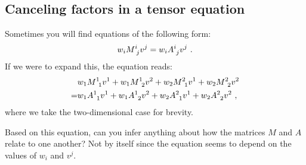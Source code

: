 \begin{subappendices}
\section{Canceling factors in a tensor equation}

Sometimes you will find equations of the following form:
\begin{align}
    w_i M\aij{i}{j}v^j = w_i A\aij{i}{j}v^j \ .
    \label{eq:canceling:factors:wMv}
\end{align}
If we were to expand this, the equation reads:
\begin{align}
    &w_1 M\aij{1}{1}v^1 + w_1 M\aij{1}{2}v^2
    + w_2 M\aij{2}{1}v^1 + w_2 M\aij{2}{2}v^2
    \\
    =&
    w_1 A\aij{1}{1}v^1 + w_1 A\aij{1}{2}v^2
    + w_2 A\aij{2}{1}v^1 + w_2 A\aij{2}{2}v^2 \ ,
    \label{eq:canceling:factors:wMv:long}
\end{align}
where we take the two-dimensional case for brevity. 

Based on this equation, can you infer anything about how the matrices $M$ and $A$ relate to one another? Not by itself since the equation seems to depend on the values of $w_i$ and $v^j$. 


\end{subappendices}
